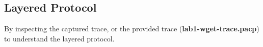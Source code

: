 

\subsection{Layered Protocol}


By inspecting the captured trace, or the provided trace ({\bf lab1-wget-trace.pacp}) to understand the layered protocol.


